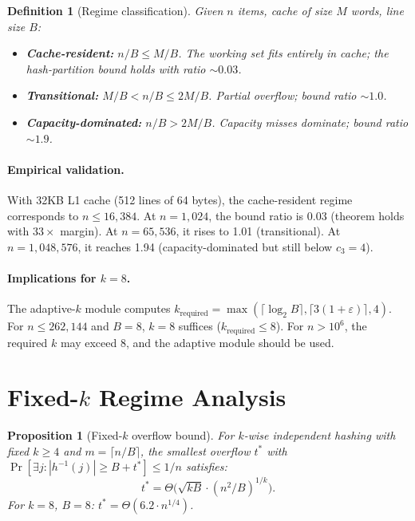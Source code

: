 \documentclass[11pt]{article}
\newtheorem{definition}[theorem]{Definition}
\newtheorem{proposition}[theorem]{Proposition}
\begin{document}
\begin{definition}[Regime classification]
\label{def:regimes}
Given $n$ items, cache of size $M$ words, line size $B$:
\begin{itemize}
\item \textbf{Cache-resident:} $n/B \le M/B$.  The working set fits
  entirely in cache; the hash-partition bound holds with ratio ${\sim}0.03$.
\item \textbf{Transitional:} $M/B < n/B \le 2M/B$.  Partial overflow;
  bound ratio ${\sim}1.0$.
\item \textbf{Capacity-dominated:} $n/B > 2M/B$.  Capacity misses
  dominate; bound ratio ${\sim}1.9$.
\end{itemize}
\end{definition}

\paragraph{Empirical validation.}
With 32KB L1 cache (512 lines of 64 bytes), the cache-resident regime
corresponds to $n \le 16{,}384$.  At $n = 1{,}024$, the bound ratio is
0.03 (theorem holds with $33\times$ margin).  At $n = 65{,}536$, it rises
to 1.01 (transitional).  At $n = 1{,}048{,}576$, it reaches 1.94
(capacity-dominated but still below $c_3 = 4$).

\paragraph{Implications for $k = 8$.}
The adaptive-$k$ module computes $k_{\mathrm{required}} = \max(\lceil
\log_2 B \rceil, \lceil 3(1 + \varepsilon) \rceil, 4)$.  For $n \le
262{,}144$ and $B = 8$, $k = 8$ suffices ($k_{\mathrm{required}} \le 8$).
For $n > 10^6$, the required $k$ may exceed 8, and the adaptive module
should be used.

\section{Fixed-$k$ Regime Analysis}
\label{app:fixedk}

\begin{proposition}[Fixed-$k$ overflow bound]
\label{prop:fixedk}
For $k$-wise independent hashing with fixed $k \ge 4$ and
$m = \lceil n/B \rceil$, the smallest overflow $t^*$ with
$\Pr[\exists j: |h^{-1}(j)| \ge B + t^*] \le 1/n$ satisfies:
\[
  t^* = \Theta\bigl(\sqrt{kB} \cdot (n^2/B)^{1/k}\bigr).
\]
For $k = 8$, $B = 8$: $t^* = \Theta(6.2 \cdot n^{1/4})$.
\end{proposition}
\end{document}

